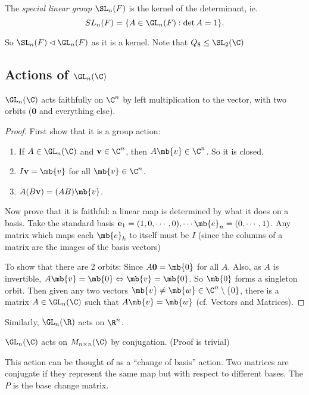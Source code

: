 \documentclass[a4paper]{article}
\begin{document}
  \begin{defi}
    The \emph{special linear group} $\SL_n(F)$ is the kernel of the determinant, ie.
    \[
      SL_n(F) = \{A\in \GL_n(F): \det A = 1\}.
    \]
  \end{defi}

  So $\SL_n(F)\lhd \GL_n(F)$ as it is a kernel. Note that $Q_8\leq \SL_2(\C)$
  \subsection{Actions of \texorpdfstring{$\GL_n(\C)$}{GLn(C)}}
  \begin{prop}
    $\GL_n(\C)$ acts faithfully on $\C^n$ by left multiplication to the vector, with two orbits ($\mathbf{0}$ and everything else).
  \end{prop}

  \begin{proof}
    First show that it is a group action:
    \begin{enumerate}[label=\arabic{*}.]
        \setcounter{enumi}{0}
      \item If $A\in \GL_n(\C)$ and $\mathbf{v}\in \C^n$, then $A\mb{v}\in \C^n$. So it is closed.
      \item $I\mathbf{v} = \mb{v}$ for all $\mb{v}\in \C^n$.
      \item $A(B\mathbf{v}) = (AB)\mb{v}$.
    \end{enumerate}

    Now prove that it is faithful: a linear map is determined by what it does on a basis. Take the standard basis $\mathbf{e}_1 = (1, 0, \cdots, 0), \cdots \mb{e}_n = (0, \cdots, 1)$. Any matrix which maps each $\mb{e}_k$ to itself must be $I$ (since the columns of a matrix are the images of the basis vectors)

    To show that there are 2 orbits: Since $A\mathbf{0} = \mb{0}$ for all $A$. Also, as $A$ is invertible, $A\mb{v} = \mb{0}\Leftrightarrow \mb{v} = \mb{0}$. So $\mb{0}$ forms a singleton orbit. Then given any two vectors $\mb{v}\not= \mb{w}\in \C^n\setminus\{0\}$, there is a matrix $A\in \GL_n(\C)$ such that $A\mb{v} = \mb{w}$ (cf. Vectors and Matrices).
  \end{proof}

  Similarly, $\GL_n(\R)$ acts on $\R^n$.

  \begin{prop}
    $\GL_n(\C)$ acts on $M_{n\times n}(\C)$ by conjugation. (Proof is trivial)
  \end{prop}
  This action can be thought of as a ``change of basis'' action. Two matrices are conjugate if they represent the same map but with respect to different bases. The $P$ is the base change matrix.
\end{document}
